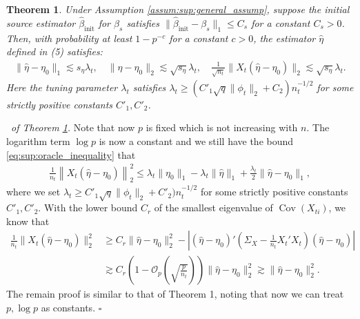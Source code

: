 \documentclass[12pt]{article}
\newtheorem{thm}{Theorem}
\newenvironment{pf}{{\noindent \it Proof}\ }{\hfill $\square$\par}
\begin{document}
\begin{thm}
    \label{thm:sup:model_shift}
    Under Assumption \ref{assum:sup:general_assump}, suppose the initial source estimator $\hat{\beta}_{\text{init}}$ for $\beta_s$ satisfies $\|\hat{\beta}_{\text{init}} - \beta_s\|_1 \le C_s$ for a constant $C_s>0$. Then, with probability at least $1-p^{-c}$ for a constant $c>0$, the estimator $\hat{\eta}$ defined in (5) satisfies:
    \begin{align*}
        \|\hat{\eta} - \eta_0\|_1 \lesssim s_\eta \lambda_t,\quad \|\hat{\eta} - \eta_0\|_2 \lesssim \sqrt{s_\eta }\lambda_t,\quad \frac{1}{\sqrt{n_t}}\|X_t(\hat{\eta} - \eta_0)\|_2 \lesssim \sqrt{s_\eta} \lambda_t.
    \end{align*}
    Here the tuning parameter $\lambda_t$ satisfies $\lambda_t\ge (C'_1\sqrt{q}\|\phi_t\|_2+C_2)n_t^{-1/2}$ for some strictly positive constants $C'_1,C'_2$. 
\end{thm}

\begin{pf}{\it of Theorem \ref{thm:sup:model_shift}. }
    Note that now $p$ is fixed which is not increasing with $n$. The logarithm term $\log p$ is now a constant and we still have the bound \eqref{eq:sup:oracle_inequality} that 
    \begin{align*}
       \frac{1}{n_t} \left\|X_t\left(\hat{\eta} - \eta_0\right)\right\|_2^2 \le 
        \lambda_t \|\eta_0\|_1 - \lambda_t \|\hat{\eta}\|_1 + \frac{\lambda_t}{2}\|\hat{\eta} - \eta_0\|_1, 
    \end{align*}
    where we set $\lambda_t \ge C'_1\sqrt{q}\|\phi_t\|_2 +C'_2)n_t^{-1/2}$ for some strictly positive constants $C'_1,C'_2$. With the lower bound $C_r$ of the smallest eigenvalue of $\operatorname{Cov}(X_{ti})$, we know that 
    \begin{align*}
        \frac{1}{n_t}\|X_t(\hat{\eta} - \eta_0)\|_2^2 &\ge C_r \|\hat{\eta} - \eta_0\|_2^2 - \left|(\hat{\eta} - \eta_0)'\left(\Sigma_X - \frac{1}{n_t}X_t'X_t\right)(\hat{\eta} - \eta_0)\right|\\& \gtrsim
        C_r\left(1 - \mathcal{O}_p\left(\sqrt{\frac{p}{n_t}}\right)\right) \|\hat{\eta} - \eta_0\|_2^2 \gtrsim \|\hat{\eta} - \eta_0\|_2^2. 
    \end{align*}
    The remain proof is similar to that of Theorem 1, noting that now we can treat $p,\log p$ as constants. 
\end{pf}
\end{document}
